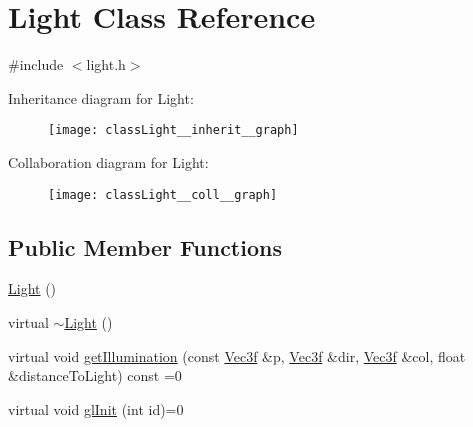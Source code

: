 \hypertarget{classLight}{\section{Light Class Reference}
\label{classLight}
}


{\ttfamily \#include $<$light.\+h$>$}



Inheritance diagram for Light\+:
\nopagebreak
\begin{figure}[H]
\begin{center}
\leavevmode
\texttt{[image: classLight\_\_inherit\_\_graph]}
\end{center}
\end{figure}


Collaboration diagram for Light\+:
\nopagebreak
\begin{figure}[H]
\begin{center}
\leavevmode
\texttt{[image: classLight\_\_coll\_\_graph]}
\end{center}
\end{figure}
\subsection*{Public Member Functions}
\begin{DoxyCompactItemize}
\item 
\hyperlink{classLight_aeb5df09a25a32f19fdffa761268ba24f}{Light} ()
\item 
virtual \hyperlink{classLight_abe675054027c4b4a4f3e9a31d330931f}{$\sim$\+Light} ()
\item 
virtual void \hyperlink{classLight_a4db9e33493b0449fe3fa09a22f48234c}{get\+Illumination} (const \hyperlink{classVec3f}{Vec3f} \&p, \hyperlink{classVec3f}{Vec3f} \&dir, \hyperlink{classVec3f}{Vec3f} \&col, float \&distance\+To\+Light) const =0
\item 
virtual void \hyperlink{classLight_a998feb6228a1d098c9fd6b276e6aff80}{gl\+Init} (int id)=0
\end{DoxyCompactItemize}


